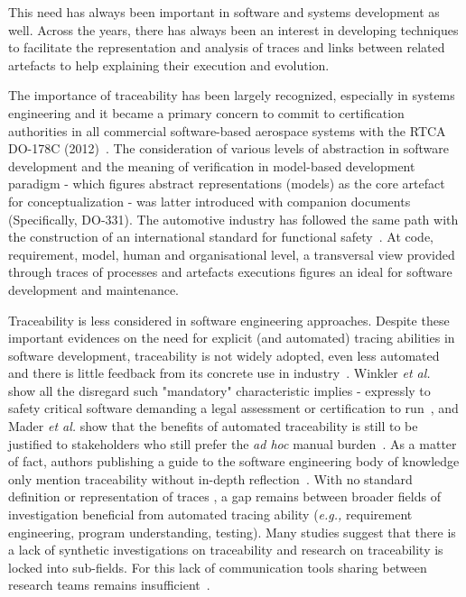 This need has always been important in software and systems development as well. Across the years, there has always been an interest in developing techniques to facilitate the representation and analysis of traces and links between related artefacts to help explaining their execution and evolution. 

The importance of traceability has been largely recognized, especially in systems engineering and it became a primary concern to commit to {certification authorities} in all commercial software-based aerospace systems with the RTCA DO-178C (2012)~\cite{moy2013-DO-178C-testing}. The consideration of various levels of abstraction in software development and the meaning of verification in model-based development paradigm - which figures abstract representations (models) as the core artefact for conceptualization -  was latter introduced with companion documents (Specifically, DO-331). The automotive industry has followed the same path with the construction of an international standard for functional safety~\cite{iso26262}. At code, requirement, model, human and organisational level, a transversal view provided through traces of processes and artefacts executions figures an ideal for software development and maintenance.

Traceability is less considered in software engineering approaches. Despite these important evidences on the need for explicit (and automated) tracing abilities in software development, traceability is not widely adopted, even less automated and there is little feedback from its concrete use in industry~\cite{panis2010-req-traceability-deployment-in-commercial-engineering-organisation}.
Winkler \textit{et al.}~\cite{winkler2010-survey-traceability-and-MDE} show all the disregard such "{mandatory}" characteristic implies - expressly to safety critical software demanding a legal assessment or certification to run~\cite{winkler2010-survey-traceability-and-MDE}, and Mader \textit{et al.} show that the benefits of automated traceability is still to be justified to stakeholders who still prefer the {\textit{ad hoc} manual burden}~\cite{mader2009-motivation-matters-in-traceability-practitioner-survey}.
As a matter of fact, authors publishing a guide to the software engineering body of knowledge only mention traceability without in-depth reflection~\cite{swebok2014}. With no standard  definition or representation of traces , a gap remains between broader fields of investigation beneficial from automated tracing ability (\textit{e.g.,} requirement engineering, program understanding, testing). Many studies suggest that there is a {lack of synthetic investigations on traceability} and research on traceability is {locked into sub-fields}. For this lack of communication tools sharing between research teams remains insufficient~\cite{antoniol2017-traceability-grand-challenges,wohlrab2020-traceability-organization-process-culture,winkler2010-survey-traceability-and-MDE}.\cite{Rosenkranz_2013} 



